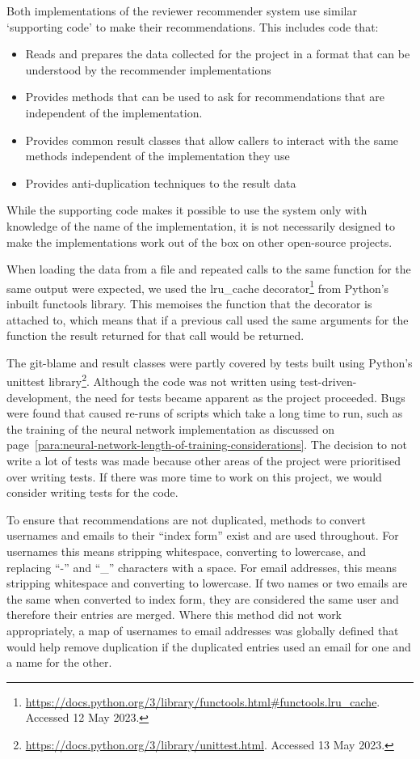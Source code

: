 Both implementations of the reviewer recommender system use similar `supporting code' to make their recommendations. This includes code that:
\begin{itemize}
    \item Reads and prepares the data collected for the project in a format that can be understood by the recommender implementations
    \item Provides methods that can be used to ask for recommendations that are independent of the implementation.
    \item Provides common result classes that allow callers to interact with the same methods independent of the implementation they use
    \item Provides anti-duplication techniques to the result data
\end{itemize}

While the supporting code makes it possible to use the system only with knowledge of the name of the implementation, it is not necessarily designed to make the implementations work out of the box on other open-source projects.

When loading the data from a file and repeated calls to the same function for the same output were expected, we used the lru\_cache decorator\footnote{\url{https://docs.python.org/3/library/functools.html\#functools.lru\_cache}. Accessed 12 May 2023.} from Python's inbuilt functools library. This memoises the function that the decorator is attached to, which means that if a previous call used the same arguments for the function the result returned for that call would be returned.

The git-blame and result classes were partly covered by tests built using Python's unittest library\footnote{\url{https://docs.python.org/3/library/unittest.html}. Accessed 13 May 2023.}. Although the code was not written using test-driven-development, the need for tests became apparent as the project proceeded. Bugs were found that caused re-runs of scripts which take a long time to run, such as the training of the neural network implementation as discussed on page~\ref{para:neural-network-length-of-training-considerations}. The decision to not write a lot of tests was made because other areas of the project were prioritised over writing tests. If there was more time to work on this project, we would consider writing tests for the code.

\label{para:de-duplication-supporting-code}To ensure that recommendations are not duplicated, methods to convert usernames and emails to their ``index form'' exist and are used throughout. For usernames this means stripping whitespace, converting to lowercase, and replacing ``-'' and ``\_'' characters with a space. For email addresses, this means stripping whitespace and converting to lowercase. If two names or two emails are the same when converted to index form, they are considered the same user and therefore their entries are merged. Where this method did not work appropriately, a map of usernames to email addresses was globally defined that would help remove duplication if the duplicated entries used an email for one and a name for the other.

